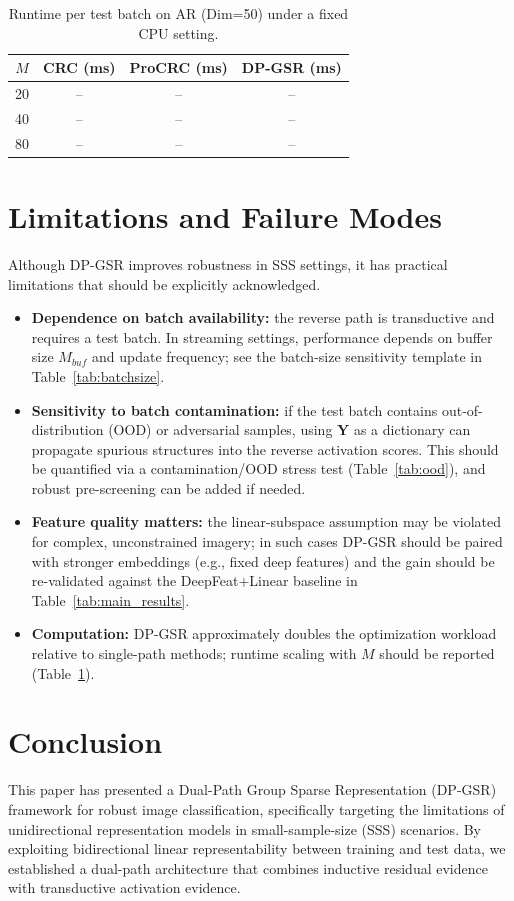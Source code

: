 \documentclass[10pt,comsoc]{IEEEtran}
\begin{document}
\begin{table}[t]
\centering
\caption{Runtime per test batch on AR (Dim=50) under a fixed CPU setting.}
\label{tab:runtime}
\begin{tabular}{c|ccc}
\hline
$M$ & CRC (ms) & ProCRC (ms) & DP-GSR (ms) \\ \hline
20 & -- & -- & -- \\
40 & -- & -- & -- \\
80 & -- & -- & -- \\
\hline
\end{tabular}
\end{table}

\section{Limitations and Failure Modes}
Although DP-GSR improves robustness in SSS settings, it has practical limitations that should be explicitly acknowledged.
\begin{itemize}
    \item \textbf{Dependence on batch availability:} the reverse path is transductive and requires a test batch. In streaming settings, performance depends on buffer size $M_{buf}$ and update frequency; see the batch-size sensitivity template in Table~\ref{tab:batchsize}.
    \item \textbf{Sensitivity to batch contamination:} if the test batch contains out-of-distribution (OOD) or adversarial samples, using $\mathbf{Y}$ as a dictionary can propagate spurious structures into the reverse activation scores. This should be quantified via a contamination/OOD stress test (Table~\ref{tab:ood}), and robust pre-screening can be added if needed.
    \item \textbf{Feature quality matters:} the linear-subspace assumption may be violated for complex, unconstrained imagery; in such cases DP-GSR should be paired with stronger embeddings (e.g., fixed deep features) and the gain should be re-validated against the DeepFeat+Linear baseline in Table~\ref{tab:main_results}.
    \item \textbf{Computation:} DP-GSR approximately doubles the optimization workload relative to single-path methods; runtime scaling with $M$ should be reported (Table~\ref{tab:runtime}).
\end{itemize}

\section{Conclusion}
This paper has presented a Dual-Path Group Sparse Representation (DP-GSR) framework for robust image classification, specifically targeting the limitations of unidirectional representation models in small-sample-size (SSS) scenarios. By exploiting bidirectional linear representability between training and test data, we established a dual-path architecture that combines inductive residual evidence with transductive activation evidence.
\end{document}
